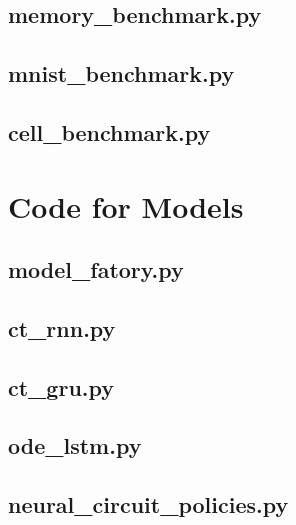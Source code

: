 \documentclass[draft,final]{vutinfth} %
\begin{document}
    \subsection{memory\_benchmark.py}
    
    \subsection{mnist\_benchmark.py}
    
    \subsection{cell\_benchmark.py}
    
    
    \section{Code for Models}
    \subsection{model\_fatory.py}
    
    \subsection{ct\_rnn.py}
    
    \subsection{ct\_gru.py}
    
    \subsection{ode\_lstm.py}
    
    \subsection{neural\_circuit\_policies.py}
    
\end{document}
